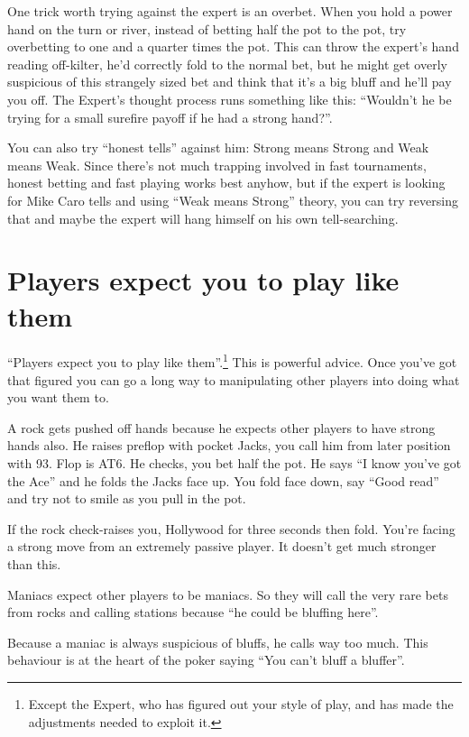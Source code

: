 One trick worth trying against the expert is an overbet. When you
hold a power hand on the turn or river, instead of betting half the pot
to the pot, try overbetting to one and a quarter times the pot. This can
throw the expert's hand reading off-kilter, he'd correctly fold to
the normal bet, but he might get overly suspicious of this strangely
sized bet and think that it's a big bluff and he'll pay you off.
The Expert's thought process runs something like this: ``Wouldn't he
be trying for a small surefire payoff if he had a strong hand?''.

You can also try ``honest tells'' against him: Strong means Strong and
Weak means Weak. Since there's not much trapping involved in fast
tournaments, honest betting and fast playing works best anyhow, but
if the expert is looking for Mike Caro tells and using
``Weak means Strong'' theory, you can try reversing that and maybe
the expert will hang himself on his own tell-searching.

\section{Players expect you to play like them}

``Players expect you to play like them''.\footnote{Except the Expert, who
has figured out your style of play, and has made the adjustments
needed to exploit it.} This is powerful advice.
Once you've got that figured you
can go a long way to manipulating other players into doing what
you want them to.

A rock gets pushed off hands because he expects other players to
have strong hands also. He raises preflop with pocket Jacks,
you call him from later position with 93. Flop is AT6. He checks, you
bet half the pot. He says ``I know you've got the Ace'' and he
folds the Jacks face up. You fold face down, say ``Good read''
and try not to smile as you pull in the pot.

If the rock check-raises you, Hollywood for three seconds then fold.
You're facing a strong move from an extremely passive player. It
doesn't get much stronger than this.

Maniacs expect other players to be maniacs. So they will call the
very rare bets from rocks and calling stations because ``he could
be bluffing here''.

Because a maniac is always suspicious of bluffs, he calls way too much.
This behaviour is at the heart of the poker saying ``You can't bluff
a bluffer''.

